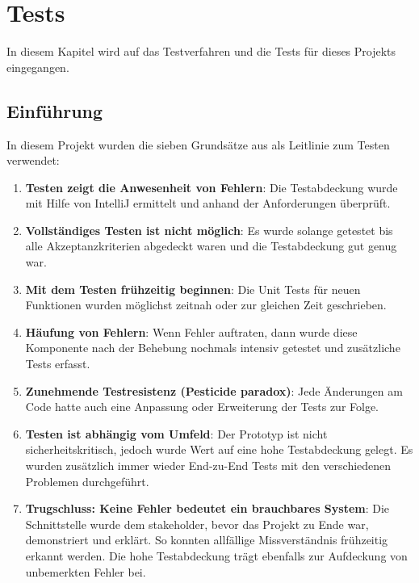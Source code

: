 %
%

\chapter{Tests \resultAssignment{[R6]}}\label{chap.tests} 
In diesem Kapitel wird auf das Testverfahren und die Tests für dieses Projekts eingegangen.

\section{Einführung}
In diesem Projekt wurden die sieben Grundsätze aus \cite{test_soft_book} als Leitlinie zum Testen verwendet:
\begin{enumerate}
\item \textbf{Testen zeigt die Anwesenheit von Fehlern}: Die Testabdeckung wurde mit Hilfe von IntelliJ ermittelt und anhand der Anforderungen überprüft.
\item \textbf{Vollständiges Testen ist nicht möglich}: Es wurde solange getestet bis alle Akzeptanzkriterien abgedeckt waren und die Testabdeckung gut genug war.
\item \textbf{Mit dem Testen frühzeitig beginnen}: Die Unit Tests für neuen Funktionen wurden möglichst zeitnah oder zur gleichen Zeit geschrieben.
\item \textbf{Häufung von Fehlern}: Wenn Fehler auftraten, dann wurde diese Komponente nach der Behebung nochmals intensiv getestet und zusätzliche Tests erfasst.
\item \textbf{Zunehmende Testresistenz (Pesticide paradox)}: Jede Änderungen am Code hatte auch eine Anpassung oder Erweiterung der Tests zur Folge.
\item \textbf{Testen ist abhängig vom Umfeld}: Der Prototyp ist nicht sicherheitskritisch, jedoch wurde Wert auf eine hohe Testabdeckung gelegt. Es wurden zusätzlich immer wieder 
	End-zu-End Tests mit den verschiedenen Problemen durchgeführt.
\item \textbf{Trugschluss: Keine Fehler bedeutet ein brauchbares System}: Die Schnittstelle wurde dem \gls{stakeholder}, bevor das Projekt zu Ende war, demonstriert und erklärt. So 
	konnten allfällige Missverständnis frühzeitig erkannt werden. Die hohe Testabdeckung trägt ebenfalls zur Aufdeckung von unbemerkten Fehler bei.
\end{enumerate}

